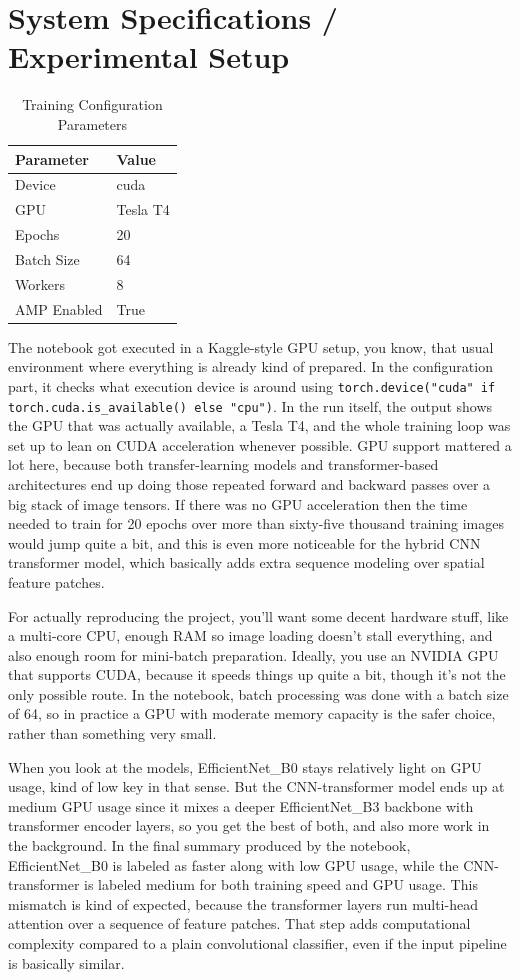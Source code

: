 \documentclass[12pt,a4paper]{report}
\begin{document}
\section{System Specifications / Experimental Setup}
\begin{table}[H]
\centering
\begin{tabular}{|l|l|}
\hline
\textbf{Parameter} & \textbf{Value} \\
\hline
Device & cuda \\
GPU & Tesla T4 \\
Epochs & 20 \\
Batch Size & 64 \\
Workers & 8 \\
AMP Enabled & True \\
\hline
\end{tabular}
\caption{Training Configuration Parameters}
\label{tab:training_config}
\end{table}

The notebook got executed in a Kaggle-style GPU setup, you know, that usual environment where everything is already kind of prepared. In the configuration part, it checks what execution device is around using \texttt{torch.device("cuda" if torch.cuda.is\_available() else "cpu")}. In the run itself, the output shows the GPU that was actually available, a Tesla T4, and the whole training loop was set up to lean on CUDA acceleration whenever possible. GPU support mattered a lot here, because both transfer-learning models and transformer-based architectures end up doing those repeated forward and backward passes over a big stack of image tensors. If there was no GPU acceleration then the time needed to train for 20 epochs over more than sixty-five thousand training images would jump quite a bit, and this is even more noticeable for the hybrid CNN transformer model, which basically adds extra sequence modeling over spatial feature patches.

For actually reproducing the project, you’ll want some decent hardware stuff, like a multi-core CPU, enough RAM so image loading doesn’t stall everything, and also enough room for mini-batch preparation. Ideally, you use an NVIDIA GPU that supports CUDA, because it speeds things up quite a bit, though it’s not the only possible route. In the notebook, batch processing was done with a batch size of 64, so in practice a GPU with moderate memory capacity is the safer choice, rather than something very small.

When you look at the models, EfficientNet\_B0 stays relatively light on GPU usage, kind of low key in that sense. But the CNN-transformer model ends up at medium GPU usage since it mixes a deeper EfficientNet\_B3 backbone with transformer encoder layers, so you get the best of both, and also more work in the background. In the final summary produced by the notebook, EfficientNet\_B0 is labeled as faster along with low GPU usage, while the CNN-transformer is labeled medium for both training speed and GPU usage. This mismatch is kind of expected, because the transformer layers run multi-head attention over a sequence of feature patches. That step adds computational complexity compared to a plain convolutional classifier, even if the input pipeline is basically similar.
\end{document}
